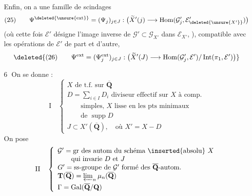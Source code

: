 Enfin, on a une famille de scindages 
\[
(25)\qquad\Psi^{\deleted{\unsure{\mathrm{ext}}}}=(\Psi_j)_{j\in J}:\bigl(\widetilde X'(j)\longrightarrow\operatorname{Hom}(\mathcal G'_j,\mathcal E'_{\deleted{\unsure{X'}}})\bigr)
\]
(où cette fois $\mathcal E'$ désigne l'image inverse
de $\mathcal G'\subset\mathcal G_{X'}$ dans $\mathcal E_{X'}$, ), compatible
avec les opérations de $\mathcal E'$ de part et
d'autre, 
\[
\deleted{(26)\qquad\Psi^{\mathrm{ext}}=(\Psi_j^{\mathrm{ext}})_{j\in J}:\bigl(\widetilde X'(J)\longrightarrow\operatorname{Hom}(\mathcal G'_j,\mathcal E')/\operatorname{Int}(\pi_1,\mathcal E')\bigr)}
\]

\textcircled{6}  On se donne : 
\[
\mathrm I\quad\left\{\begin{array}{l}
X\text{ de t.f. sur }\overline{\mathbf Q}\\
D=\sum_{i\in I}D_i\text{ diviseur effectif sur }X\text{ à comp.}\\
\qquad\text{simples, }X\text{ lisse en les pts minimaux}\\
\qquad\text{de }\operatorname{supp}D\\
J\subset X'(\overline{\mathbf Q}),\quad\text{où }X'=X-D
\end{array}\right.
\]
On pose\margin{\unsure{(}}
\[
\mathrm{II}\quad\left\{\begin{array}{l}
\mathcal G'=\text{gr des autom du schéma \inserted{absolu} }X\\
\qquad\text{qui invarie }D\text{ et }J\\
G'=\text{ss-groupe de }\mathcal G'\text{ formé des }\overline{\mathbf Q}\text{-autom.}\\
\mathbf T(\overline{\mathbf Q})=\varprojlim_n\mu_n(\overline{\mathbf Q})\\[1ex]
\Gamma=\operatorname{Gal}(\overline{\mathbf Q}/\mathbf Q)
\end{array}\right.
\]
